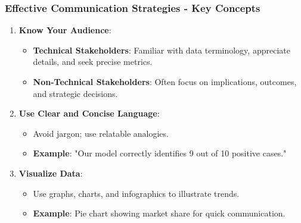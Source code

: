 \documentclass{beamer}
\begin{document}
\begin{frame}[fragile]
    \frametitle{Effective Communication Strategies - Key Concepts}
    \begin{enumerate}
        \item \textbf{Know Your Audience}:
        \begin{itemize}
            \item \textbf{Technical Stakeholders}: Familiar with data terminology, appreciate details, and seek precise metrics.
            \item \textbf{Non-Technical Stakeholders}: Often focus on implications, outcomes, and strategic decisions.
        \end{itemize}
        
        \item \textbf{Use Clear and Concise Language}:
        \begin{itemize}
            \item Avoid jargon; use relatable analogies. 
            \item \textbf{Example}: "Our model correctly identifies 9 out of 10 positive cases."
        \end{itemize}
        
        \item \textbf{Visualize Data}:
        \begin{itemize}
            \item Use graphs, charts, and infographics to illustrate trends.
            \item \textbf{Example}: Pie chart showing market share for quick communication.
        \end{itemize}
    \end{enumerate}
\end{frame}
\end{document}
